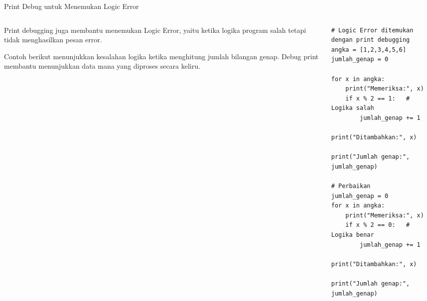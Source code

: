 \documentclass[aspectratio=169, table]{beamer}
\begin{document}
\begin{frame}[fragile]{Print Debug untuk Menemukan Logic Error}
\vspace{20pt}

\begin{columns}
    \begin{column}{0.35\linewidth}
        Print debugging juga membantu menemukan Logic Error,
        yaitu ketika logika program salah tetapi tidak
        menghasilkan pesan error.

        Contoh berikut menunjukkan kesalahan logika ketika
        menghitung jumlah bilangan genap. Debug print membantu
        menunjukkan data mana yang diproses secara keliru.
    \end{column}

    \begin{column}{0.6\linewidth}
\begin{lstlisting}[style=PythonStyle, basicstyle=\ttfamily\scriptsize]
# Logic Error ditemukan dengan print debugging
angka = [1,2,3,4,5,6]
jumlah_genap = 0

for x in angka:
    print("Memeriksa:", x)
    if x % 2 == 1:   # Logika salah
        jumlah_genap += 1
        print("Ditambahkan:", x)

print("Jumlah genap:", jumlah_genap)

# Perbaikan
jumlah_genap = 0
for x in angka:
    print("Memeriksa:", x)
    if x % 2 == 0:   # Logika benar
        jumlah_genap += 1
        print("Ditambahkan:", x)

print("Jumlah genap:", jumlah_genap)
\end{lstlisting}
    \end{column}
\end{columns}

\end{frame}
\end{document}
